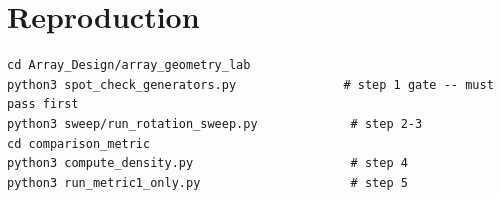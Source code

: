\documentclass[11pt]{article}
\renewcommand{\_}{\origunderscore\penalty0\hskip0pt\relax}
\begin{document}
\section{Reproduction}
\begin{verbatim}
cd Array_Design/array_geometry_lab
python3 spot_check_generators.py               # step 1 gate -- must pass first
python3 sweep/run_rotation_sweep.py             # step 2-3
cd comparison_metric
python3 compute_density.py                      # step 4
python3 run_metric1_only.py                     # step 5
\end{verbatim}
\end{document}
